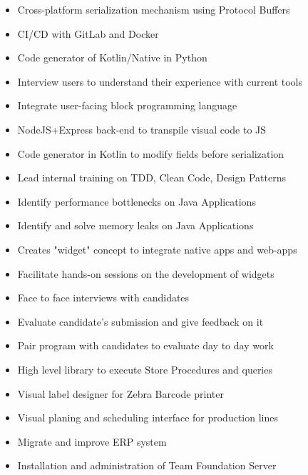 \documentclass[10pt,letterpaper,ragged2d,withhyper]{altacv}
\begin{document}
\begin{paracol}{2}

\begin{itemize}
\item Cross-platform serialization mechanism using Protocol Buffers
\item CI/CD with GitLab and Docker
\item Code generator of Kotlin/Native in Python
\item Interview users to understand their experience with current tools
\item Integrate user-facing block programming language
\item NodeJS+Express back-end to transpile visual code to JS
\item Code generator in Kotlin to modify fields before serialization
\item Lead internal training on TDD, Clean Code, Design Patterns
\item Identify performance bottlenecks on Java Applications
\item Identify and solve memory leaks on Java Applications
\item Creates "widget" concept to integrate native apps and web-apps
\item Facilitate hands-on sessions on the development of widgets
\item Face to face interviews with candidates
\item Evaluate candidate's submission and give feedback on it
\item Pair program with candidates to evaluate day to day work
\end{itemize}


\divider

\begin{itemize}
\item High level library to execute Store Procedures and queries
\item Visual label designer for Zebra Barcode printer
\item Visual planing and scheduling interface for production lines
\item Migrate and improve ERP system
\item Installation and administration of Team Foundation Server
\end{itemize}


\end{paracol}
\end{document}
